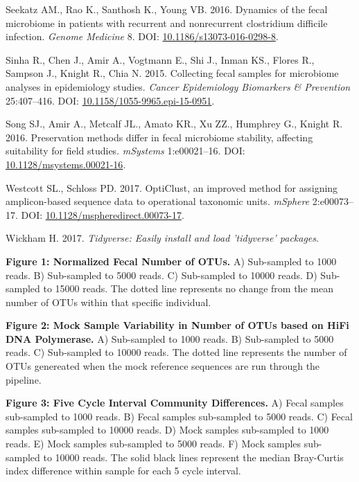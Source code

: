 \documentclass[12pt,]{article}
\begin{document}
\hypertarget{ref-erin_seekatz_2016}{}
Seekatz AM., Rao K., Santhosh K., Young VB. 2016. Dynamics of the fecal
microbiome in patients with recurrent and nonrecurrent clostridium
difficile infection. \emph{Genome Medicine} 8. DOI:
\href{https://doi.org/10.1186/s13073-016-0298-8}{10.1186/s13073-016-0298-8}.

\hypertarget{ref-preservation_Sinha_2015}{}
Sinha R., Chen J., Amir A., Vogtmann E., Shi J., Inman KS., Flores R.,
Sampson J., Knight R., Chia N. 2015. Collecting fecal samples for
microbiome analyses in epidemiology studies. \emph{Cancer Epidemiology
Biomarkers \& Prevention} 25:407--416. DOI:
\href{https://doi.org/10.1158/1055-9965.epi-15-0951}{10.1158/1055-9965.epi-15-0951}.

\hypertarget{ref-preservation_Song_2016}{}
Song SJ., Amir A., Metcalf JL., Amato KR., Xu ZZ., Humphrey G., Knight
R. 2016. Preservation methods differ in fecal microbiome stability,
affecting suitability for field studies. \emph{mSystems} 1:e00021--16.
DOI:
\href{https://doi.org/10.1128/msystems.00021-16}{10.1128/msystems.00021-16}.

\hypertarget{ref-opticlust_Westcott_2017}{}
Westcott SL., Schloss PD. 2017. OptiClust, an improved method for
assigning amplicon-based sequence data to operational taxonomic units.
\emph{mSphere} 2:e00073--17. DOI:
\href{https://doi.org/10.1128/mspheredirect.00073-17}{10.1128/mspheredirect.00073-17}.

\hypertarget{ref-tidyverse_2017}{}
Wickham H. 2017. \emph{Tidyverse: Easily install and load 'tidyverse'
packages}.

\newpage

\textbf{Figure 1: Normalized Fecal Number of OTUs.} A) Sub-sampled to
1000 reads. B) Sub-sampled to 5000 reads. C) Sub-sampled to 10000 reads.
D) Sub-sampled to 15000 reads. The dotted line represents no change from
the mean number of OTUs within that specific individual.

\textbf{Figure 2: Mock Sample Variability in Number of OTUs based on
HiFi DNA Polymerase.} A) Sub-sampled to 1000 reads. B) Sub-sampled to
5000 reads. C) Sub-sampled to 10000 reads. The dotted line represents
the number of OTUs genereated when the mock reference sequences are run
through the pipeline.

\textbf{Figure 3: Five Cycle Interval Community Differences.} A) Fecal
samples sub-sampled to 1000 reads. B) Fecal samples sub-sampled to 5000
reads. C) Fecal samples sub-sampled to 10000 reads. D) Mock samples
sub-sampled to 1000 reads. E) Mock samples sub-sampled to 5000 reads. F)
Mock samples sub-sampled to 10000 reads. The solid black lines represent
the median Bray-Curtis index difference within sample for each 5 cycle
interval.
\end{document}
